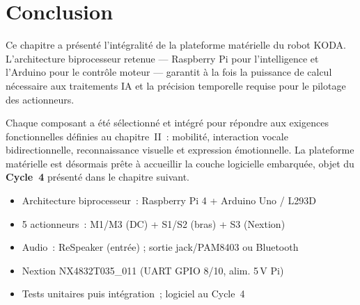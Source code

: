 \documentclass[a4paper,12pt]{report}
\begin{document}
	\section{Conclusion}
	
	Ce chapitre a présenté l'intégralité de la plateforme matérielle du robot
	KODA. L'architecture biprocesseur retenue — Raspberry Pi pour l'intelligence
	et l'Arduino pour le contrôle moteur — garantit à la fois la puissance de
	calcul nécessaire aux traitements IA et la précision temporelle requise
	pour le pilotage des actionneurs.
	
	Chaque composant a été sélectionné et intégré pour répondre aux exigences
	fonctionnelles définies au chapitre~II~: mobilité, interaction vocale
	bidirectionnelle, reconnaissance visuelle et expression émotionnelle.
	La plateforme matérielle est désormais prête à accueillir la couche logicielle
	embarquée, objet du \textbf{Cycle~4} présenté dans le chapitre suivant.
	
	\begin{tcolorbox}[colback=blue!5!white, colframe=blue!60!black,
		title=\textbf{Points clés du Cycle 3}]
		\begin{itemize}[noitemsep]
			\item Architecture biprocesseur~: Raspberry Pi 4 + Arduino Uno / L293D
			\item 5 actionneurs~: M1/M3 (DC) + S1/S2 (bras) + S3 (Nextion)
			\item Audio~: ReSpeaker (entrée) ; sortie jack/PAM8403 ou Bluetooth
			\item Nextion NX4832T035\_011 (UART GPIO 8/10, alim. 5\,V Pi)
			\item Tests unitaires puis intégration~; logiciel au Cycle~4
		\end{itemize}
	\end{tcolorbox}
\end{document}
